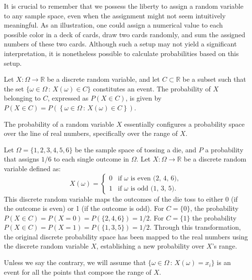 It is crucial to remember that we possess the liberty to assign a random variable to any sample space, even when the assignment might not seem intuitively meaningful. As an illustration, one could assign a numerical value to each possible color in a deck of cards, draw two cards randomly, and sum the assigned numbers of these two cards. Although such a setup may not yield a significant interpretation, it is nonetheless possible to calculate probabilities based on this setup.

\begin{definition}
Let $X : \Omega \rightarrow \mathbb{R}$ be a discrete random variable, and let $C \subset \mathbb{R}$ be a subset such that the set $\{ \omega \in \Omega \,:\, X \left( \omega \right) \in C\}$ constitutes an event. The probability of $X$ belonging to $C$, expressed as $P\left(X \in C \right)$, is given by $P\left( X \in C \right)=P \left( \left\{ \omega \in \Omega \,:\, X \left( \omega \right) \in C\right\} \right)$.
\end{definition}

The probability of a random variable $X$ essentially configures a probability space over the line of real numbers, specifically over the range of $X$. 

\begin{example}
\label{ex:probability_distribution_real_line}
Let $\Omega = \{1, 2, 3, 4, 5, 6\}$ be the sample space of tossing a die, and $P$ a probability that assigns $1/6$ to each single outcome in $\Omega$. Let $X: \Omega \rightarrow \mathbb{R}$ be a discrete random variable defined as:
    \[
    X(\omega) = 
    \begin{cases} 
      0 & \text{if } \omega \text{ is even (2, 4, 6)}, \\
      1 & \text{if } \omega \text{ is odd (1, 3, 5)}.
    \end{cases}
    \]
This discrete random variable maps the outcomes of the die toss to either 0 (if the outcome is even) or 1 (if the outcome is odd). For $C = \{0\}$, the probability $P(X \in C) = P(X = 0) = P(\{2, 4, 6\}) = 1/2$. For $C = \{1\}$ the probability $P(X \in C) = P(X = 1) = P(\{1, 3, 5\}) = 1/2$. Through this transformation, the original discrete probability space has been mapped to the real numbers using the discrete random variable $X$, establishing a new probability over $X$'s range.
\end{example}

Unless we say the contrary, we will assume that $\{ \omega \in \Omega \,:\, X \left( \omega \right) = x_i\}$ is an event for all the points that compose the range of $X$.

